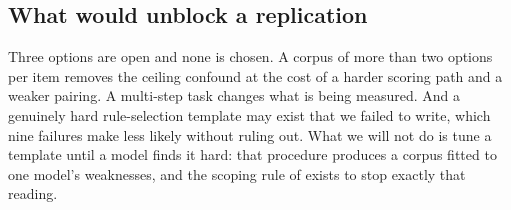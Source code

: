 \subsection{What would unblock a replication}

Three options are open and none is chosen. A corpus of more than two options
per item removes the ceiling confound at the cost of a harder scoring path
and a weaker pairing. A multi-step task changes what is being measured. And a
genuinely hard rule-selection template may exist that we failed to write,
which nine failures make less likely without ruling out. What we will not do
is tune a template until a model finds it hard: that procedure produces a
corpus fitted to one model's weaknesses, and the scoping rule of
 exists to stop exactly that reading.
